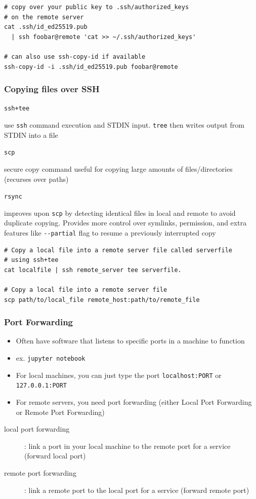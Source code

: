 \documentclass[letterpaper,12pt]{article}
\newcommand*{\lstitem}[1]{
  \setbox0\hbox{\lstinline{#1}}
  \item[\usebox0]
}
\begin{document}
\begin{lstlisting}
# copy over your public key to .ssh/authorized_keys
# on the remote server
cat .ssh/id_ed25519.pub
  | ssh foobar@remote 'cat >> ~/.ssh/authorized_keys'

# can also use ssh-copy-id if available
ssh-copy-id -i .ssh/id_ed25519.pub foobar@remote
\end{lstlisting}

\subsubsection{Copying files over SSH}
\begin{description}
 \lstitem{ssh+tee} use \lstinline{ssh} command execution and STDIN input. \lstinline{tree} then writes output from STDIN into a file
 \lstitem{scp} secure copy command useful for copying large amounts of files/directories (recurses over paths)
 \lstitem{rsync} improves upon \lstinline{scp} by detecting identical files in local and remote to avoid duplicate copying. Provides more control over symlinks, permission, and extra features like \lstinline{--partial} flag to resume a previously interrupted copy
\end{description}

\begin{lstlisting}
# Copy a local file into a remote server file called serverfile
# using ssh+tee
cat localfile | ssh remote_server tee serverfile.

# Copy a local file into a remote server file
scp path/to/local_file remote_host:path/to/remote_file
\end{lstlisting}

\subsubsection{Port Forwarding}
\begin{itemize}
 \item Often have software that listens to specific ports in a machine to function
 \item ex. \lstinline{jupyter notebook}
 \item For local machines, you can just type the port \lstinline{localhost:PORT} or \lstinline{127.0.0.1:PORT}
 \item For remote servers, you need port forwarding (either Local Port Forwarding or Remote Port Forwarding)
\end{itemize}

\begin{description}
 \item[local port forwarding]: link a port in your local machine to the remote port for a service (forward local port)
 \item[remote port forwarding]: link a remote port to the local port for a service (forward remote port)
\end{description}
\end{document}
